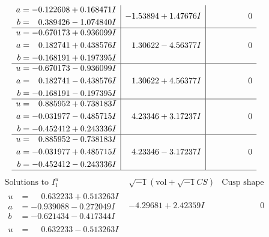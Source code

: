 \documentclass[1p]{elsarticle_modified}
\theoremstyle{definition}
\newcommand{\I}{\sqrt{-1}}
\begin{document}
$$\begin{array}{c|c|c}
\begin{aligned}
a &= -0.122608 + 0.168471 I \\
b &= \phantom{-}0.389426 - 1.074840 I\end{aligned}
 & -1.53894 + 1.47676 I & \phantom{-0.000000 } 0 \\ \hline\begin{aligned}
u &= -0.670173 + 0.936099 I \\
a &= \phantom{-}0.182741 + 0.438576 I \\
b &= -0.168191 + 0.197395 I\end{aligned}
 & \phantom{-}1.30622 - 4.56377 I & \phantom{-0.000000 } 0 \\ \hline\begin{aligned}
u &= -0.670173 - 0.936099 I \\
a &= \phantom{-}0.182741 - 0.438576 I \\
b &= -0.168191 - 0.197395 I\end{aligned}
 & \phantom{-}1.30622 + 4.56377 I & \phantom{-0.000000 } 0 \\ \hline\begin{aligned}
u &= \phantom{-}0.885952 + 0.738183 I \\
a &= -0.031977 - 0.485715 I \\
b &= -0.452412 + 0.243336 I\end{aligned}
 & \phantom{-}4.23346 + 3.17237 I & \phantom{-0.000000 } 0 \\ \hline\begin{aligned}
u &= \phantom{-}0.885952 - 0.738183 I \\
a &= -0.031977 + 0.485715 I \\
b &= -0.452412 - 0.243336 I\end{aligned}
 & \phantom{-}4.23346 - 3.17237 I & \phantom{-0.000000 } 0\\
 \hline 
 \end{array}$$\newpage$$\begin{array}{c|c|c}  
\text{Solutions to }I^u_{1}& \I (\text{vol} + \sqrt{-1}CS) & \text{Cusp shape}\\
 \hline 
\begin{aligned}
u &= \phantom{-}0.632233 + 0.513263 I \\
a &= -0.939088 - 0.272049 I \\
b &= -0.621434 - 0.417344 I\end{aligned}
 & -4.29681 + 2.42359 I & \phantom{-0.000000 } 0 \\ \hline\begin{aligned}
u &= \phantom{-}0.632233 - 0.513263 I \\

\end{aligned}
\end{array}$$
\end{document}
